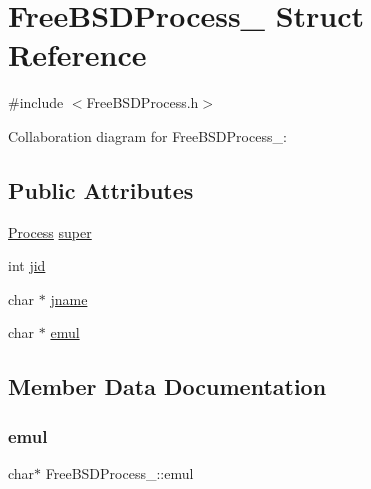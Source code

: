 \hypertarget{structFreeBSDProcess__}{}\section{Free\+B\+S\+D\+Process\+\_\+ Struct Reference}
\label{structFreeBSDProcess__}


{\ttfamily \#include $<$Free\+B\+S\+D\+Process.\+h$>$}



Collaboration diagram for Free\+B\+S\+D\+Process\+\_\+\+:
\subsection*{Public Attributes}
\begin{DoxyCompactItemize}
\item 
\hyperlink{Process_8h_a20673e8fa40981a168bf0e196c4cef3b}{Process} \hyperlink{structFreeBSDProcess___a28b04896c569314268391d2cbfa36a87}{super}
\item 
int \hyperlink{structFreeBSDProcess___a4afbdd741984d4bc5b96b3d66290a1aa}{jid}
\item 
char $\ast$ \hyperlink{structFreeBSDProcess___adc489d24793e796a15a1ac366019473f}{jname}
\item 
char $\ast$ \hyperlink{structFreeBSDProcess___a73d75e90748efef9c74fff1d819791f0}{emul}
\end{DoxyCompactItemize}


\subsection{Member Data Documentation}
\mbox{\label{structFreeBSDProcess___a73d75e90748efef9c74fff1d819791f0}} 
\subsubsection{\texorpdfstring{emul}{emul}}
{\footnotesize\ttfamily char$\ast$ Free\+B\+S\+D\+Process\+\_\+\+::emul}

\mbox{\label{structFreeBSDProcess___a4afbdd741984d4bc5b96b3d66290a1aa}} 
